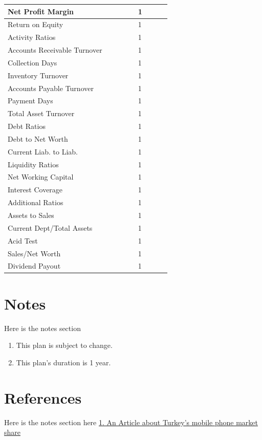 \documentclass[11pt]{article}
\begin{document}
\begin{landscape}
\begin{scriptsize}
\begin{tabular}{ | l | l | l | l | l | l | l | l | l |}
  Net Profit Margin & & & & & 1 \\ \hline
  Return on Equity & & & & & 1 \\ \hline
  Activity Ratios & & & & & 1 \\ \hline
  Accounts Receivable Turnover & & & & & 1 \\ \hline
  Collection Days & & & & & 1 \\ \hline
  Inventory Turnover & & & & & 1 \\ \hline
  Accounts Payable Turnover & & & & & 1 \\ \hline
  Payment Days & & & & & 1 \\ \hline
  Total Asset Turnover & & & & & 1 \\ \hline
  Debt Ratios & & & & & 1 \\ \hline
  Debt to Net Worth & & & & & 1 \\ \hline
  Current Liab. to Liab. & & & & & 1 \\ \hline
  Liquidity Ratios & & & & & 1 \\ \hline
  Net Working Capital & & & & & 1 \\ \hline
  Interest Coverage & & & & & 1 \\ \hline
  Additional Ratios & & & & & 1 \\ \hline
  Assets to Sales & & & & & 1 \\ \hline
  Current Dept/Total Assets & & & & & 1 \\ \hline
  Acid Test & & & & & 1 \\ \hline
  Sales/Net Worth & & & & & 1 \\ \hline
  Dividend Payout & & & & & 1 \\ \hline
\end{tabular}
\end{scriptsize}
\end{landscape}

\pagebreak

\section{Notes}
Here is the notes section
\begin{enumerate}
\item This plan is subject to change.
\item This plan's duration is 1 year.
\end{enumerate}

\section{References}
Here is the notes section\newline
\hypertarget{market_share}{here}\newline
\href{http://http://sayarbilgi.net/mobil-aygitlar/7-mobil-aygit-haberleri/88-turkiyenin-en-cok-satan-cep-telefonlari.html}{1. An Article about Turkey's mobile phone market share}
\end{document}

